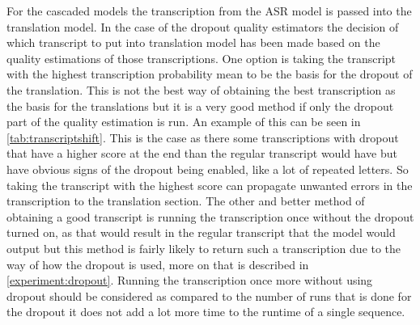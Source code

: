 For the cascaded models the transcription from the ASR model is passed into the translation model. 
In the case of the dropout quality estimators the decision of which transcript to put into translation model has been made based on the quality estimations of those transcriptions.
One option is taking the transcript with the highest transcription probability mean to be the basis for the dropout of the translation. 
This is not the best way of obtaining the best transcription as the basis for the translations but it is a very good method if only the dropout part of the quality estimation is run. 
An example of this can be seen in \autoref{tab:transcriptshift}.
This is the case as there some transcriptions with dropout that have a higher score at the end than the regular transcript would have but have obvious signs of the dropout being enabled, like a lot of repeated letters.
So taking the transcript with the highest score can propagate unwanted errors in the transcription to the translation section.
The other and better method of obtaining a good transcript is running the transcription once without the dropout turned on, as that would result in the regular transcript that the model would output but this method is fairly likely to return such a transcription due to the way of how the dropout is used, more on that is described in \autoref{experiment:dropout}.
Running the transcription once more without using dropout should be considered as compared to the number of runs that is done for the dropout it does not add a lot more time to the runtime of a single sequence.
